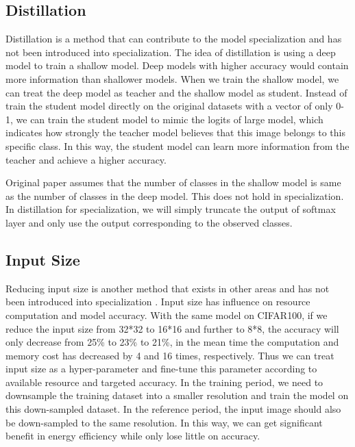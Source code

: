 \documentclass[conference]{IEEEtran}
\begin{document}
\begin{spacing}{0.9}
\subsection{Distillation}
Distillation \cite{hinton2015distilling} is a method that can contribute to the model specialization and has not been introduced into specialization. The idea of distillation is using a deep model to train a shallow model. Deep models with higher accuracy would contain more information than shallower models. When we train the shallow model, we can treat the deep model as teacher and the shallow model as student. Instead of train the student model directly on the original datasets with a vector of only 0-1, we can train the student model to mimic the logits of large model, which indicates how strongly the teacher model believes that this image belongs to this specific class. In this way, the student model can learn more information from the teacher and achieve a higher accuracy. 

Original paper \cite{hinton2015distilling} assumes that the number of classes in the shallow model is same as the number of classes in the deep model. This does not hold in specialization. In distillation for specialization, we will simply truncate the output of softmax layer and only use the output corresponding to the observed classes.

\subsection{Input Size}
Reducing input size is another method that exists in other areas and has not been introduced into specialization \cite{krizhevsky2009learning, fu2017look}. Input size has influence on resource computation and model accuracy. With the same model on CIFAR100, if we reduce the input size from 32*32 to 16*16 and further to 8*8, the accuracy will only decrease from 25\% to 23\% to 21\%, in the mean time the computation and memory cost has decreased by 4 and 16 times, respectively. Thus we can treat input size as a hyper-parameter and fine-tune this parameter according to available resource and targeted accuracy. In the training period,  we need to downsample the training dataset into a smaller resolution and train the model on this down-sampled dataset. In the reference period, the input image should also be down-sampled to the same resolution. In this way, we can get significant benefit in energy efficiency while only lose little on accuracy.




\end{spacing}
\end{document}
